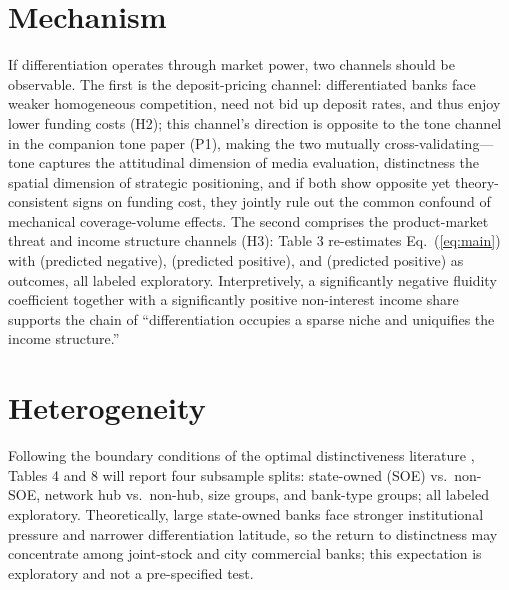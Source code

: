 \section{Mechanism}\label{sec:mech}

If differentiation operates through market power, two channels should
be observable. The first is the deposit-pricing channel:
differentiated banks face weaker homogeneous competition, need not
bid up deposit rates, and thus enjoy lower funding costs (H2); this
channel's direction is opposite to the tone channel in the companion
tone paper (P1), making the two mutually cross-validating---tone
captures the attitudinal dimension of media evaluation, distinctness
the spatial dimension of strategic positioning, and if both show
opposite yet theory-consistent signs on funding cost, they jointly
rule out the common confound of mechanical coverage-volume effects.
The second comprises the product-market threat and income structure
channels (H3): Table 3 re-estimates Eq.~(\ref{eq:main}) with
 (predicted negative),
 (predicted positive), and
 (predicted positive) as outcomes, all labeled exploratory.
Interpretively, a significantly negative fluidity coefficient
together with a significantly positive non-interest income share
supports the chain of ``differentiation occupies a sparse niche and
uniquifies the income structure.''

\section{Heterogeneity}\label{sec:het}

Following the boundary conditions of the optimal distinctiveness
literature \parencite{haans2019distinctiveness,su2024optimal},
Tables 4 and 8 will report four subsample splits: state-owned (SOE)
vs.\ non-SOE, network hub vs.\ non-hub, size groups, and bank-type
groups; all labeled exploratory. Theoretically, large state-owned
banks face stronger institutional pressure and narrower
differentiation latitude, so the return to distinctness may
concentrate among joint-stock and city commercial banks; this
expectation is exploratory and not a pre-specified test.

